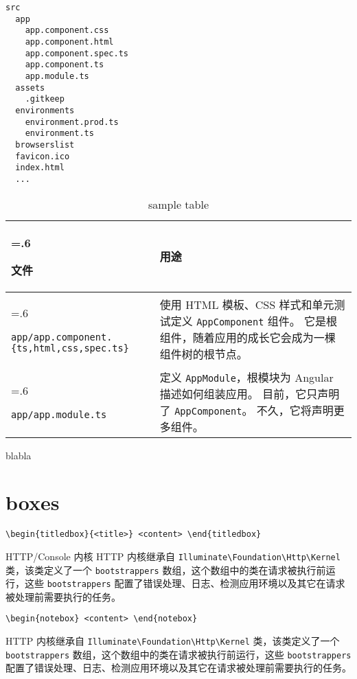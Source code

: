 \documentclass{progartcn}
\begin{document}
\begin{lstlisting}[style=bashoutputstyle]
src
  app
    app.component.css
    app.component.html
    app.component.spec.ts
    app.component.ts
    app.module.ts
  assets
    .gitkeep
  environments
    environment.prod.ts
    environment.ts
  browserslist
  favicon.ico
  index.html
  ...
\end{lstlisting}

\noindent
\begin{table}[h!]
  \caption{sample table}\label{table:1}
  \begin{tabularx}{\textwidth}{>{\hsize=.6\hsize\raggedright\arraybackslash}X>{\raggedright\arraybackslash}X}\toprule
    \bfseries{文件} & \bfseries{用途}\\ \midrule
    \verb|app/app.component.{ts,html,css,spec.ts}| & 使用 HTML 模板、CSS 样式和单元测试定义 \verb|AppComponent| 组件。 它是根组件，随着应用的成长它会成为一棵组件树的根节点。\\
    \verb|app/app.module.ts| & 定义 \verb|AppModule|，根模块为 Angular 描述如何组装应用。 目前，它只声明了 \verb|AppComponent|。 不久，它将声明更多组件。\\ \bottomrule
  \end{tabularx}
\end{table}
blabla

\clearpage

\section{boxes}

\noindent\verb|\begin{titledbox}{<title>} <content> \end{titledbox}|

\begin{titledbox}{HTTP/Console 内核}
  HTTP 内核继承自 \verb|Illuminate\Foundation\Http\Kernel| 类，该类定义了一个 \verb|bootstrappers| 数组，这个数组中的类在请求被执行前运行，这些 \verb|bootstrappers| 配置了错误处理、日志、检测应用环境以及其它在请求被处理前需要执行的任务。
\end{titledbox}

\noindent\verb|\begin{notebox} <content> \end{notebox}|

\begin{notebox}
  HTTP 内核继承自 \verb|Illuminate\Foundation\Http\Kernel| 类，该类定义了一个 \verb|bootstrappers| 数组，这个数组中的类在请求被执行前运行，这些 \verb|bootstrappers| 配置了错误处理、日志、检测应用环境以及其它在请求被处理前需要执行的任务。
\end{notebox}
\end{document}
